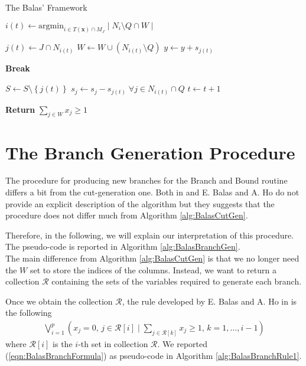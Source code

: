 \documentclass[a4paper,12pt]{mydeitesi_eng}
\begin{document}
\begin{chapter}{The Balas' Framework}
\begin{algorithm}[h]
{	$i(t) \gets \text{argmin}_{i \in T(\mathbf{x}) \cap M_J} \mid N_i \setminus Q \cap W \mid$\;
	
	$j(t) \gets J \cap N_{i(t)}$\;
	$W \gets W \cup \left( N_{i(t)} \setminus Q \right)$\;
	$y \gets y + s_{j(t)}$\;
	
	{
		\textbf{Break}\;
	}
	
	$S \gets S \setminus \left\{j(t)\right\}$\;
	$s_j \gets s_j - s_{j(t)} \; \forall j \in N_{i(t)} \cap Q$\;
	$t \gets t + 1$\;
}

\textbf{Return } $\sum_{j \in W} x_j \ge 1$\;


\BlankLine
\BlankLine

\caption{\emph{Balas cut generation} (BCG) procedure.}
\label{alg:BalasCutGen}
\end{algorithm}

\section{The Branch Generation Procedure}
\label{sec:BranchGeneration}

The procedure for producing new branches for the Branch and Bound routine differs a bit from the cut-generation one.
Both in \cite{Balas1980-CuttinPlanes} and \cite{Balas1980-Computational} E. Balas and A. Ho do not provide an explicit description of the algorithm but they suggests that the procedure does not differ much from Algorithm \ref{alg:BalasCutGen}.

Therefore, in the following, we will explain our interpretation of this procedure.
The pseudo-code is reported in Algorithm \ref{alg:BalasBranchGen}.\\

The main difference from Algorithm \ref{alg:BalasCutGen} is that we no longer need the $W$ set to store the indices of the columns.
Instead, we want to return a collection $\mathcal{R}$ containing the sets of the variables required to generate each branch.

Once we obtain the collection $\mathcal{R}$, the rule developed by E. Balas and A. Ho in \cite{Balas1980-Computational} is the following
\begin{align}
\bigvee_{i=1}^p \left( x_j = 0, \, j \in \mathcal{R}[i] \mid \sum_{j \in \mathcal{R}[k]} x_j \geq 1, \, k = 1, \dots, i-1  \right)
\label{eqn:BalasBranchFormula}
\end{align}
where $\mathcal{R}[i]$ is the $i$-th set in collection $\mathcal{R}$.
We reported (\ref{eqn:BalasBranchFormula}) as pseudo-code in Algorithm \ref{alg:BalasBranchRule1}.


\end{chapter}
\end{document}
